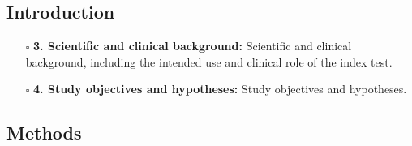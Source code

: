 \documentclass[11pt]{article}
\def\tightlist{}
\begin{document}
\begin{Form}
\subsection{Introduction}\label{introduction}

\begin{itemize}
\tightlist
\item[$\square$]
  \textbf{3. Scientific and clinical background:} Scientific and
  clinical background, including the intended use and clinical role of
  the index test.
\item[$\square$]
  \textbf{4. Study objectives and hypotheses:} Study objectives and
  hypotheses.
\end{itemize}

\subsection{Methods}\label{methods}


\end{Form}
\end{document}
